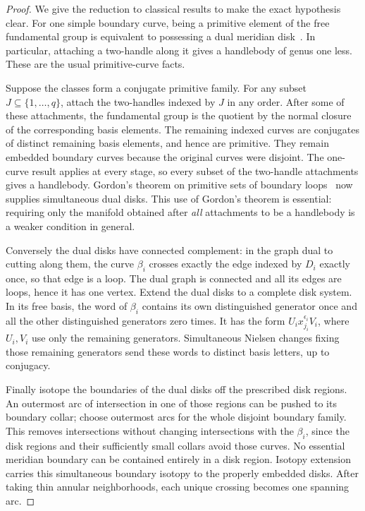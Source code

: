 \begin{proof}
We give the reduction to classical results to make the exact hypothesis
clear.  For one simple boundary curve, being a primitive element of the
free fundamental group is equivalent to possessing a dual meridian
disk~\cite[Section~4]{hensel2021}.
In particular, attaching a two-handle along it gives a handlebody of genus
one less.  These are the usual primitive-curve facts.

Suppose the classes form a conjugate primitive family.  For any subset
$J\subseteq\{1,\ldots,q\}$, attach the two-handles indexed by $J$ in
any order.  After some of these attachments, the fundamental group is the
quotient by the normal closure of the corresponding basis elements.  The
remaining indexed curves are conjugates of distinct remaining basis
elements, and hence are primitive. They remain embedded boundary curves because the original curves
were disjoint.  The one-curve result applies at every stage, so every subset
of the two-handle attachments gives a handlebody.  Gordon's theorem on
primitive sets of boundary loops~\cite{gordon1987} now supplies simultaneous
dual disks.
This use of Gordon's theorem is essential: requiring only the manifold
obtained after \emph{all} attachments to be a handlebody is a weaker
condition in general.

Conversely the dual disks have connected complement: in the graph dual to
cutting along them, the curve $\beta_i$ crosses exactly the edge indexed
by $D_i$ exactly once, so that edge is a loop.  The dual graph is connected
and all its edges are loops, hence it has one vertex.  Extend the dual disks
to a complete disk system.  In its free
basis, the word of $\beta_i$ contains its own distinguished generator once
and all the other distinguished generators zero times.  It has the form
$U_i x_{j_i}^{\epsilon_i}V_i$, where $U_i,V_i$ use only the remaining
generators.  Simultaneous Nielsen changes fixing those remaining generators
send these words to distinct basis letters, up to conjugacy.

Finally isotope the boundaries of the dual disks off the prescribed disk
regions.  An outermost arc of intersection in one of those regions can be
pushed to its boundary collar; choose outermost arcs for the whole disjoint
boundary family.  This removes intersections without changing intersections
with the $\beta_i$, since the disk regions and their sufficiently small
collars avoid those curves.  No essential meridian boundary can be contained
entirely in a disk region.  Isotopy extension carries this simultaneous
boundary isotopy to the properly embedded disks.  After taking thin annular
neighborhoods, each unique crossing becomes one spanning arc.
\end{proof}

